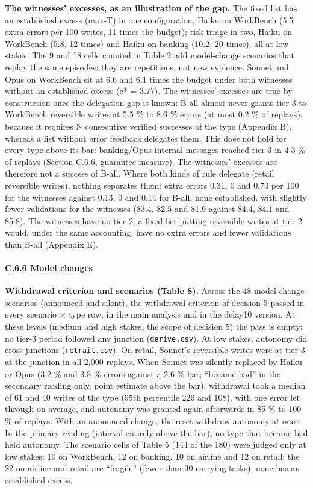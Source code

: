 \textbf{The witnesses' excesses, as an illustration of the gap.} The fixed list has an established excess (max-T) in one configuration, Haiku on WorkBench (5.5 extra errors per 100 writes, 11 times the budget); risk triage in two, Haiku on WorkBench (5.8, 12 times) and Haiku on banking (10.2, 20 times), all at low stakes. The 9 and 18 cells counted in Table 2 add model-change scenarios that replay the same episodes; they are repetitions, not new evidence. Sonnet and Opus on WorkBench sit at 6.6 and 6.1 times the budget under both witnesses without an established excess (c* = 3.77). The witnesses' excesses are true by construction once the delegation gap is known: B-all almost never grants tier 3 to WorkBench reversible writes at 5.5 \% to 8.6 \% errors (at most 0.2 \% of replays), because it requires N consecutive verified successes of the type (Appendix B), whereas a list without error feedback delegates them. This does not hold for every type above its bar: banking/Opus internal messages reached tier 3 in 4.3 \% of replays (Section C.6.6, guarantee measure). The witnesses' excesses are therefore not a success of B-all. Where both kinds of rule delegate (retail reversible writes), nothing separates them: extra errors 0.31, 0 and 0.70 per 100 for the witnesses against 0.13, 0 and 0.14 for B-all, none established, with slightly fewer validations for the witnesses (83.4, 82.5 and 81.9 against 84.4, 84.1 and 85.8). The witnesses have no tier 2; a fixed list putting reversible writes at tier 2 would, under the same accounting, have no extra errors and fewer validations than B-all (Appendix E).

\paragraph{C.6.6 Model changes}\label{c.6.6-model-changes}

\textbf{Withdrawal criterion and scenarios (Table 8).} Across the 48 model-change scenarios (announced and silent), the withdrawal criterion of decision 5 passed in every scenario × type row, in the main analysis and in the delay10 version. At these levels (medium and high stakes, the scope of decision 5) the pass is empty: no tier-3 period followed any junction (\texttt{derive.\allowbreak{}csv}). At low stakes, autonomy did cross junctions (\texttt{retrait.\allowbreak{}csv}). On retail, Sonnet's reversible writes were at tier 3 at the junction in all 2,000 replays. When Sonnet was silently replaced by Haiku or Opus (3.2 \% and 3.8 \% errors against a 2.6 \% bar; ``became bad'' in the secondary reading only, point estimate above the bar), withdrawal took a median of 61 and 40 writes of the type (95th percentile 226 and 108), with one error let through on average, and autonomy was granted again afterwards in 85 \% to 100 \% of replays. With an announced change, the reset withdrew autonomy at once. In the primary reading (interval entirely above the bar), no type that became bad held autonomy. The scenario cells of Table 5 (144 of the 180) were judged only at low stakes: 10 on WorkBench, 12 on banking, 10 on airline and 12 on retail; the 22 on airline and retail are ``fragile'' (fewer than 30 carrying tasks); none has an established excess.

